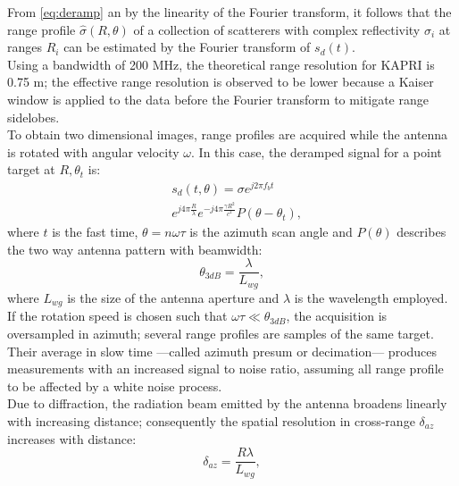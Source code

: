 From \eqref{eq:deramp} an by the linearity of the Fourier transform, it follows that the range profile $\hat{\sigma}\left(R, \theta\right)$ of a collection of scatterers with complex reflectivity $\sigma_i$ at ranges $R_{i}$ can be estimated by the Fourier transform of $s_{d}\left(t\right)$.\\
Using a bandwidth of 200 MHz, the theoretical range resolution for KAPRI is 0.75 m\cite{Strozzi2011}; the effective range resolution is observed to be lower because a Kaiser window is applied to the data before the Fourier transform to mitigate range sidelobes.\\
To obtain two dimensional images, range profiles are acquired while the antenna is rotated with angular velocity $\omega$. 
In this case, the deramped signal for a point target at $R,\theta_t$ is:
\begin{equation}\label{eq:signal_model}
	\begin{aligned}
	& s_{d}\left(t,\theta\right) = \sigma e^{j 2 \pi f_b t}   \\
	& e^{j 4 \pi \frac{R}{\lambda}}  e^{-j 4 \pi \frac{\gamma R^2}{c^2}} P\left(\theta - \theta_t\right),
	\end{aligned}
\end{equation} 
where $t$ is the fast time,  $\theta = n \omega \tau$ is the azimuth scan angle and $P\left(\theta\right)$ describes the two way antenna pattern with beamwidth:
\begin{equation}\label{eq:azimuth_resolution}
	\theta_{3dB} = \frac{\lambda}{L_{wg}},
\end{equation}
where $L_{wg}$ is the size of the antenna aperture and $\lambda$ is the wavelength employed.
If the rotation speed is chosen such that $\omega \tau \ll \theta_{3dB}$, the acquisition is oversampled in azimuth; several range profiles are samples of the same target. Their average in slow time  ---called azimuth presum or decimation--- produces measurements with an increased signal to noise ratio, assuming all range profile to be affected by a white noise process.\\
Due to diffraction, the radiation beam emitted by the antenna broadens linearly with increasing distance; consequently the spatial resolution in cross-range $\delta_{az}$ increases with distance:
\begin{equation}\label{eq:azimuth_ground_resolution}
	\delta_{az} = \frac{R \lambda}{L_{wg}},
\end{equation}
